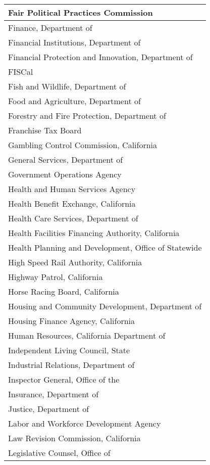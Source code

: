 \documentclass[
]{article}
\begin{document}
\begin{table}
\begin{tabular}[t]{l}
\hline
Fair Political Practices Commission\\
\hline
Finance, Department of\\
\hline
Financial Institutions, Department of\\
\hline
Financial Protection and Innovation, Department of\\
\hline
FISCal\\
\hline
Fish and Wildlife, Department of\\
\hline
Food and Agriculture, Department of\\
\hline
Forestry and Fire Protection, Department of\\
\hline
Franchise Tax Board\\
\hline
Gambling Control Commission, California\\
\hline
General Services, Department of\\
\hline
Government Operations Agency\\
\hline
Health and Human Services Agency\\
\hline
Health Benefit Exchange, California\\
\hline
Health Care Services, Department of\\
\hline
Health Facilities Financing Authority, California\\
\hline
Health Planning and Development, Office of Statewide\\
\hline
High Speed Rail Authority, California\\
\hline
Highway Patrol, California\\
\hline
Horse Racing Board, California\\
\hline
Housing and Community Development, Department of\\
\hline
Housing Finance Agency, California\\
\hline
Human Resources, California Department of\\
\hline
Independent Living Council, State\\
\hline
Industrial Relations, Department of\\
\hline
Inspector General, Office of the\\
\hline
Insurance, Department of\\
\hline
Justice, Department of\\
\hline
Labor and Workforce Development Agency\\
\hline
Law Revision Commission, California\\
\hline
Legislative Counsel, Office of\\
\hline

\end{tabular}
\end{table}
\end{document}
